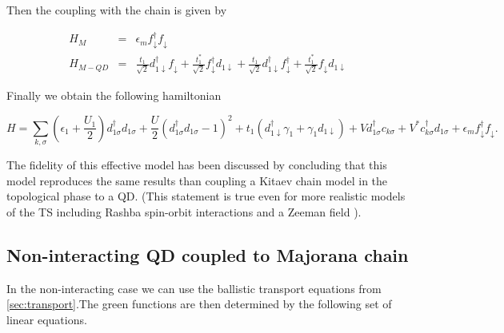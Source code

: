 
Then the coupling with the chain is given by 

\begin{eqnarray*}
H_{M} & = & \epsilon_{m}f_{\downarrow}^{\dagger}f_{\downarrow}\\
H_{M-QD}&=&\frac{t_1}{\sqrt{2}}d_{1\downarrow}^{\dagger}f_{\downarrow}+\frac{t_1^{*}}{\sqrt{2}}f_{\downarrow}^{\dagger}d_{1\downarrow}+\frac{t_1}{\sqrt{2}}d_{1\downarrow}^{\dagger}f_{\downarrow}^{\dagger}+\frac{t_1^{*}}{\sqrt{2}}f_{\downarrow}d_{1\downarrow}
\end{eqnarray*}

Finally we obtain the following hamiltonian

\begin{equation}
H =\sum_{k,\sigma}\left(\epsilon_1+\frac{U_1}{2}\right)d_{1\sigma}^{\dagger}d_{1\sigma}+ \frac{U}{2}(d_{1\sigma}^{\dagger}d_{1\sigma}-1)^{2} + t_1 \left(d_{1\downarrow}^{\dagger}\gamma_{1}+\gamma_{1}d_{1\downarrow}\right) + Vd^\dagger_{1\sigma}c_{k\sigma}+V^* c^\dagger_{k\sigma}d_{1\sigma}+ \epsilon_{m}f_{\downarrow}^{\dagger}f_{\downarrow}.
\label{eq:QD-Mham}
\end{equation}


The fidelity of this effective model has been discussed by \citet{ruiz-tijerina_interaction_2015}
concluding that this model reproduces the
same results than coupling a  Kitaev chain model in the topological phase to a QD.
(This statement is true even for more realistic models of the TS including Rashba spin-orbit interactions and a Zeeman field \citep{ruiz-tijerina_interaction_2015}
).\\


\subsection{Non-interacting QD coupled to  Majorana chain \label{sec:GreenMaj-DQD}}

In the non-interacting case we can use the ballistic transport equations from \ref{sec:transport}.The green functions are then determined by the following set of linear equations. 




